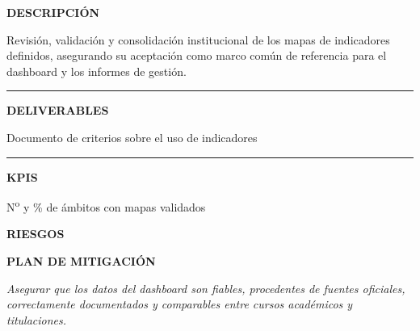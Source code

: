\documentclass[11pt,a4paper]{scrreprt}
\newcommand{\fieldlabel}[1]{%
  {\footnotesize\sffamily\bfseries\color{mutedcolor}\MakeUppercase{#1}}\par\nopagebreak[4]
}
\newcommand{\fieldsep}{\vspace{3pt}\noindent\textcolor{bordercolor}{\rule{\linewidth}{0.4pt}}\vspace{3pt}\par}
\begin{document}
\begin{tcolorbox}[pabox={dashcolor}{PA2.2 \enspace\textbullet\enspace Validación y consolidación institucional de los mapas de indicadores}]

\fieldlabel{Descripci\'on}
{\small Revisión, validación y consolidación institucional de los mapas de indicadores definidos, asegurando su aceptación como marco común de referencia para el dashboard y los informes de gestión.}\par
\fieldsep
\fieldlabel{Deliverables}
{\small Documento de criterios sobre el uso de indicadores}\par
\fieldsep
\fieldlabel{KPIs}
{\small N\textsuperscript{o} y \% de ámbitos con mapas validados}\par
\end{tcolorbox}
\begin{tcolorbox}[riskbox]
{\footnotesize\sffamily\bfseries\color{red!50!black} RIESGOS}\par{}
\end{tcolorbox}
\begin{tcolorbox}[mitbox]
{\footnotesize\sffamily\bfseries\color{green!40!black} PLAN DE MITIGACI\'ON}\par{}
\end{tcolorbox}
\vspace{8pt}

\newpage
{}
{\small\color{mutedcolor}\itshape Asegurar que los datos del dashboard son fiables, procedentes de fuentes oficiales, correctamente documentados y comparables entre cursos académicos y titulaciones.}\par\vspace{6pt}
\end{document}
